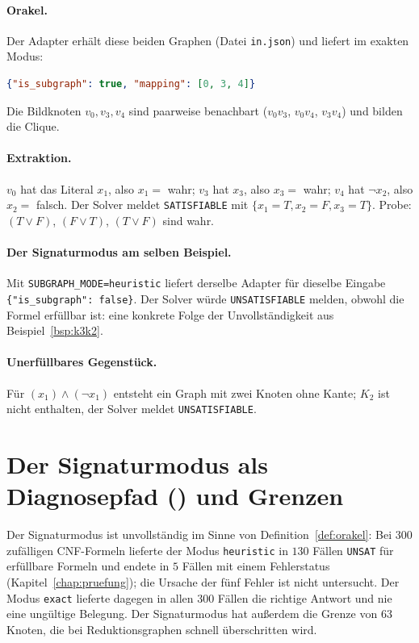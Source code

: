 \paragraph{Orakel.} Der Adapter erhält diese beiden Graphen (Datei \texttt{in.json}) und liefert im exakten Modus:

\begin{lstlisting}[language=JSON, caption={Ausgabe des Adapters im Modus \texttt{exact} (echter Lauf)}, label={lst:beispiel_out}]
{"is_subgraph": true, "mapping": [0, 3, 4]}
\end{lstlisting}

Die Bildknoten $v_0,v_3,v_4$ sind paarweise benachbart ($v_0v_3$, $v_0v_4$, $v_3v_4$) und bilden die Clique.

\paragraph{Extraktion.} $v_0$ hat das Literal $x_1$, also $x_1=$ wahr; $v_3$ hat $x_3$, also $x_3=$ wahr; $v_4$ hat $\neg x_2$, also $x_2=$ falsch. Der Solver meldet \texttt{SATISFIABLE} mit $\{x_1{=}T, x_2{=}F, x_3{=}T\}$. Probe: $(T\vee F)$, $(F\vee T)$, $(T\vee F)$ sind wahr.

\paragraph{Der Signaturmodus am selben Beispiel.} Mit \texttt{SUBGRAPH\_MODE=heuristic} liefert derselbe Adapter für dieselbe Eingabe \texttt{\{"is\_subgraph": false\}}. Der Solver würde \texttt{UNSATISFIABLE} melden, obwohl die Formel erfüllbar ist: eine konkrete Folge der Unvollständigkeit aus Beispiel~\ref{bsp:k3k2}.

\paragraph{Unerfüllbares Gegenstück.} Für $(x_1)\wedge(\neg x_1)$ entsteht ein Graph mit zwei Knoten ohne Kante; $K_2$ ist nicht enthalten, der Solver meldet \texttt{UNSATISFIABLE}.

\section{Der Signaturmodus als Diagnosepfad () und Grenzen}
\label{sec:solver_grenzen}

Der Signaturmodus ist unvollständig im Sinne von Definition~\ref{def:orakel}: Bei $300$ zufälligen CNF-Formeln lieferte der Modus \texttt{heuristic} in $130$ Fällen \texttt{UNSAT} für erfüllbare Formeln und endete in $5$ Fällen mit einem Fehlerstatus (Kapitel~\ref{chap:pruefung}); die Ursache der fünf Fehler ist nicht untersucht. Der Modus \texttt{exact} lieferte dagegen in allen $300$ Fällen die richtige Antwort und nie eine ungültige Belegung. Der Signaturmodus hat außerdem die Grenze von $63$ Knoten, die bei Reduktionsgraphen schnell überschritten wird.

